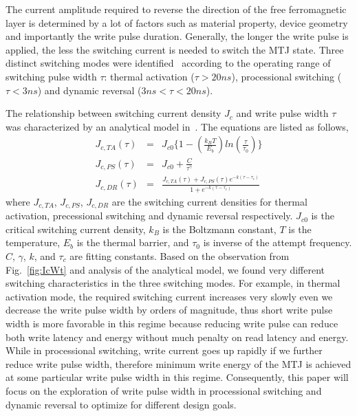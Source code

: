 The current amplitude required to reverse the direction of the free ferromagnetic layer is determined by a lot of factors such as material property, device geometry and importantly the write pulse duration. Generally, the longer the write pulse is applied, the less the switching current is needed to switch the MTJ state. Three distinct switching modes were identified~\cite{STTRAM:JAP07} according to the operating range of switching pulse width $\tau$: thermal activation ($\tau>20ns$), processional switching ($\tau<3ns$) and dynamic reversal ($3ns<\tau<20ns$).

The relationship between switching current density $J_{c}$ and write pulse width $\tau$ was characterized by an analytical model in~\cite{STTRAM:IEDM09}. The equations are listed as follows,
\begin{eqnarray}
J_{c,TA}(\tau) &=& J_{c0}\{1- (\frac{k_{B}T}{E_{b}})ln(\frac{\tau}{\tau_{0}})\} \label{eqn:jcta} \\
J_{c,PS}(\tau) &=& J_{c0}+ \frac{C}{\tau^{\gamma}} \label{eqn:jcps} \\
J_{c,DR}(\tau) &=& \frac{J_{c,TA}(\tau)+J_{c,PS}(\tau)e^{-k(\tau - \tau_{c})}}{1+e^{-k(\tau - \tau_{c})}} \label{eqn:jcdr}
\end{eqnarray}
where $J_{c,TA}$, $J_{c,PS}$, $J_{c,DR}$ are the switching current densities for thermal activation, precessional switching and dynamic reversal respectively. $J_{c0}$ is the critical switching current density, $k_{B}$ is the Boltzmann constant, $T$ is the temperature, $E_{b}$ is the thermal barrier, and $\tau_{0}$ is inverse of the attempt frequency. $C$, $\gamma$, $k$, and $\tau_{c}$ are fitting constants. Based on the observation from Fig.~\ref{fig:IcWt} and analysis of the analytical model,  we found very different switching characteristics in the three switching modes. For example, in thermal activation mode, the required switching current increases very slowly even we decrease the write pulse width by orders of magnitude, thus short write pulse width is more favorable in this regime because reducing write pulse can reduce both write latency and energy without much penalty on read latency and energy. While in processional switching, write current goes up rapidly if we further reduce write pulse width, therefore minimum write energy of the MTJ is achieved at some particular write pulse width in this regime. Consequently, this paper will focus on the exploration of write pulse width in processional switching and dynamic reversal to optimize for different design goals.

